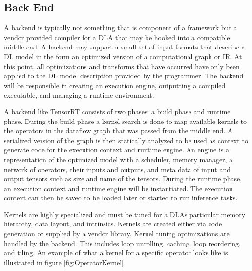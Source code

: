 \subsection{Back End}
A backend is typically not something that is component of a framework
but a vendor provided compiler for a DLA that may be hooked into a compatible
middle end. A backend may support a small set of input formats that describe
a DL model in the form an optimized version of a computational graph or IR.
At this point, all optimizations and transforms that have occurred have
only been applied to the DL model description provided by the programmer.
The backend will be responsible in creating
an execution engine, outputting a compiled executable, and managing
a runtime environment.

A backend like TensorRT \cite{tensorRT} consists of two phases: a build phase
and runtime phase. During the build phase a kernel search is done to map
available kernels to the operators in the dataflow graph that was passed from
the middle end. A serialized version of the graph is then statically analyzed to
be used as context to generate code for the execution context and runtime
engine.  An engine is a representation of the optimized model with a scheduler,
memory manager, a network of operators, their inputs and outputs, and meta data
of input and output tensors such as size and name of the tensors.  During the
runtime phase, an execution context and runtime engine will be instantiated.
The execution context can then be saved to be loaded later or started to run
inference tasks.

Kernels are highly specialized and must be tuned for a DLAs particular memory
hierarchy, data layout, and intrinsics. Kernels are created either via code
generation or supplied by a vendor library. Kernel tuning optimizations are
handled by the backend.  This includes loop unrolling, caching, loop
reordering, and tiling. An example of what a kernel for a specific operator
looks like is illustrated in figure \ref{fig:OperatorKernel}

